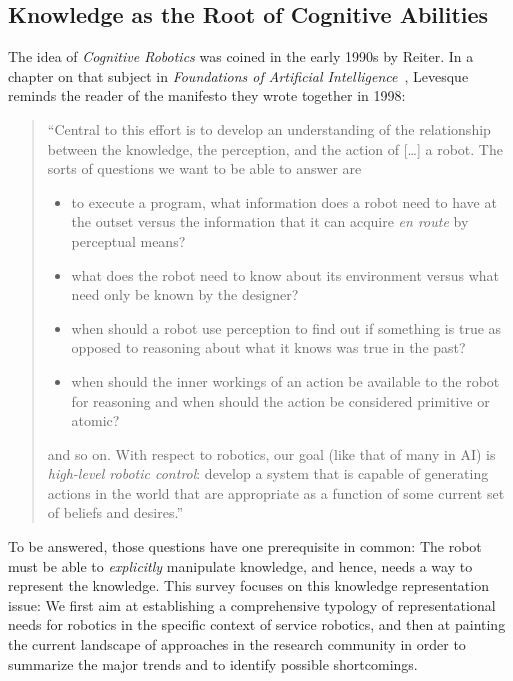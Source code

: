 \documentclass[journal]{IEEEtran}
\begin{document}
\subsection{Knowledge as the Root of Cognitive Abilities}
\label{sect|cognitive-abilities}

The idea of \emph{Cognitive Robotics} was coined in the early 1990s by Reiter.
In a chapter on that subject in \emph{Foundations of Artificial 
Intelligence}~\cite{Levesque2008}, Levesque reminds the reader of the manifesto 
they wrote together in 1998:

\begin{quotation}

    ``Central to this effort is to develop an understanding of the relationship
    between the knowledge, the perception, and the action of [\ldots] a robot. The
    sorts of questions we want to be able to answer are

    \begin{itemize} 

        \item to execute a program, what information does a robot need to have
        at the outset versus the information that it can acquire \emph{en route}
        by perceptual means?

        \item what does the robot need to know about its environment versus what
        need only be known by the designer?

        \item when should a robot use perception to find out if something is
        true as opposed to reasoning about what it knows was true in the past?

        \item when should the inner workings of an action be available to the
        robot for reasoning and when should the action be considered primitive
        or atomic?

    \end{itemize}
    \noindent
    and so on. With respect to robotics, our goal (like that of many in AI) is
    \emph{high-level robotic control}: develop a system that is capable of
    generating actions in the world that are appropriate as a function of some
    current set of beliefs and desires.''

\end{quotation}

To be answered, those questions have one prerequisite in common: The robot must
be able to \emph{explicitly} manipulate knowledge, and hence, needs a way to
represent the knowledge.
% 
This survey focuses on this knowledge representation issue: We first aim at
establishing a comprehensive typology of representational needs for
robotics in the specific context of service robotics, and then at painting the
current landscape of approaches in the research community in order to summarize 
the major trends and to identify possible shortcomings.
\end{document}
